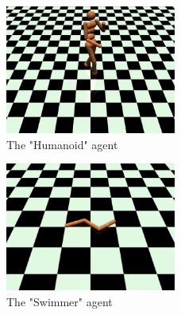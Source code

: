 \begin{figure}[H]
	\includegraphics[width=0.5\textwidth]{images/agent_humanoid.png}
	\centering
	\caption{The "Humanoid" agent}\label{fig_agent_humanoid}
\end{figure}
\begin{figure}[H]
	\includegraphics[width=0.5\textwidth]{images/agent_swimmer.png}
	\centering
	\caption{The "Swimmer" agent}\label{fig_agent_swimmer}
\end{figure}



